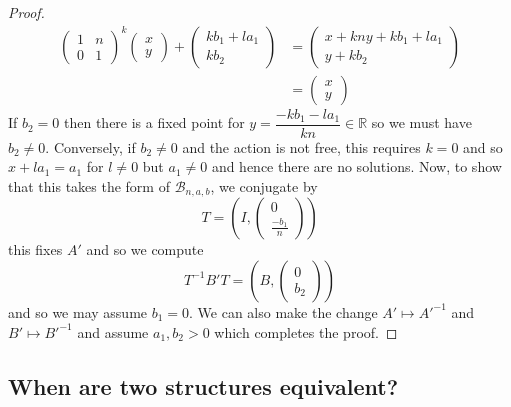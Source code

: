 \begin{proof}
\begin{align*}
        \begin{pmatrix}
            1 & n \\
            0 & 1
        \end{pmatrix}^k \begin{pmatrix}
                            x \\ y
                        \end{pmatrix} + \begin{pmatrix}
                                            kb_1 + la_1 \\ kb_2
                                        \end{pmatrix} & =
        \begin{pmatrix}
            x + kny +kb_1 + la_1 \\ y + kb_2
        \end{pmatrix}                    \\
                                        & = \begin{pmatrix}
                                                x \\ y
                                            \end{pmatrix}
    \end{align*}
    If $b_2 = 0$ then there is a fixed point for $y = \dfrac{-kb_1-la_1}{kn} \in \mathbb{R}$ so we must have $b_2 \neq 0$. Conversely, if $b_2 \neq 0$ and the action is not free,
    this requires $k=0$ and so $x+la_1 = a_1$ for $l \neq 0$ but $a_1 \neq 0$ and hence there are no solutions. Now, to show that this takes the form of $\mathcal{B}_{n,a,b}$, we conjugate by
    $$T = \left( I, \begin{pmatrix}
                0 \\ \frac{-b_1}{n}
            \end{pmatrix}\right)$$
    this fixes $A'$ and so we compute $$T^{-1}B'T = \left(B, \begin{pmatrix}
                0 \\ b_2
            \end{pmatrix} \right)$$
    and so we may assume $b_1 =0$. We can also make the change $A' \mapsto A'^{-1}$ and $B' \mapsto B'^{-1}$ and assume $a_1,b_2 >0$ which completes the proof.
\end{proof}

\subsection{When are two structures equivalent?}

